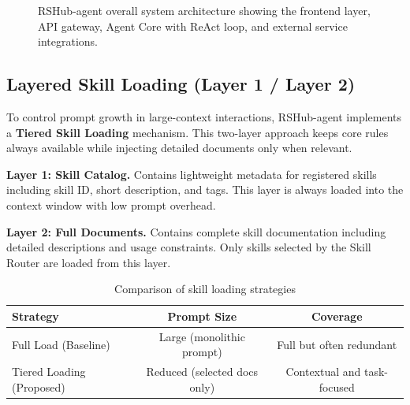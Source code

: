\begin{figure}[!htbp]
{%
	}
	\caption{RSHub-agent overall system architecture showing the frontend layer, API gateway, Agent Core with ReAct loop, and external service integrations.}
	\label{fig:system_architecture}
\end{figure}

\subsection{Layered Skill Loading (Layer 1 / Layer 2)}

To control prompt growth in large-context interactions, RSHub-agent implements a \textbf{Tiered Skill Loading} mechanism. This two-layer approach keeps core rules always available while injecting detailed documents only when relevant.

\textbf{Layer 1: Skill Catalog.} Contains lightweight metadata for registered skills including skill ID, short description, and tags. This layer is always loaded into the context window with low prompt overhead.

\textbf{Layer 2: Full Documents.} Contains complete skill documentation including detailed descriptions and usage constraints. Only skills selected by the Skill Router are loaded from this layer.

\begin{table}[htbp]
	\centering
	\caption{Comparison of skill loading strategies}
	\label{tab:skill_loading}
	\begin{tabular}{lcc}
		\toprule
		\textbf{Strategy} & \textbf{Prompt Size} & \textbf{Coverage} \\
		\midrule
		Full Load (Baseline) & Large (monolithic prompt) & Full but often redundant \\
		Tiered Loading (Proposed) & Reduced (selected docs only) & Contextual and task-focused \\
		\bottomrule
	\end{tabular}
\end{table}

